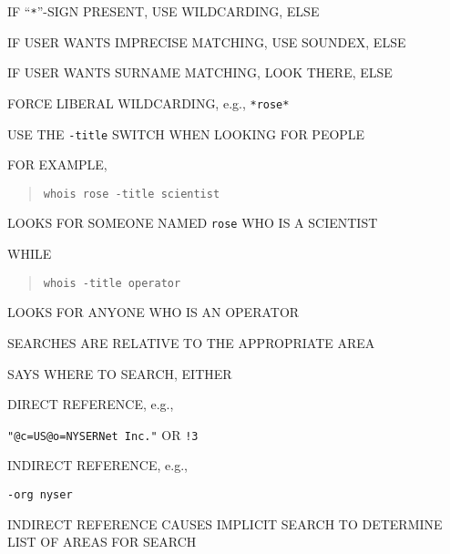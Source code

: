 \begin{bwslide}

\begin{nrtc}
\item	IF ``\verb"*"''-SIGN PRESENT, USE WILDCARDING, ELSE

\item	IF USER WANTS IMPRECISE MATCHING, USE SOUNDEX, ELSE

\item	IF USER WANTS SURNAME MATCHING, LOOK THERE, ELSE

\item	FORCE LIBERAL WILDCARDING, e.g., \verb"*rose*"
\end{nrtc}
\end{bwslide}


\begin{bwslide}

\begin{nrtc}
\item	USE THE \verb"-title" SWITCH WHEN LOOKING FOR PEOPLE

\item	FOR EXAMPLE,
\begin{quote}\small\begin{verbatim}
whois rose -title scientist
\end{verbatim}\end{quote}
LOOKS FOR SOMEONE NAMED \verb"rose" WHO IS A SCIENTIST

\item	WHILE
\begin{quote}\small\begin{verbatim}
whois -title operator
\end{verbatim}\end{quote}
LOOKS FOR ANYONE WHO IS AN OPERATOR

\item	SEARCHES ARE RELATIVE TO THE APPROPRIATE AREA
\end{nrtc}
\end{bwslide}


\begin{bwslide}

\begin{nrtc}
\item	SAYS WHERE TO SEARCH, EITHER

\item	DIRECT REFERENCE, e.g.,
    \begin{nrtc}
    \item	\verb|"@c=US@o=NYSERNet Inc."| OR \verb"!3"
    \end{nrtc}

\item	INDIRECT REFERENCE, e.g.,
    \begin{nrtc}
    \item	\verb"-org nyser"
    \end{nrtc}

\item	INDIRECT REFERENCE CAUSES IMPLICIT SEARCH TO DETERMINE LIST OF AREAS
	FOR SEARCH
\end{nrtc}
\end{bwslide}


